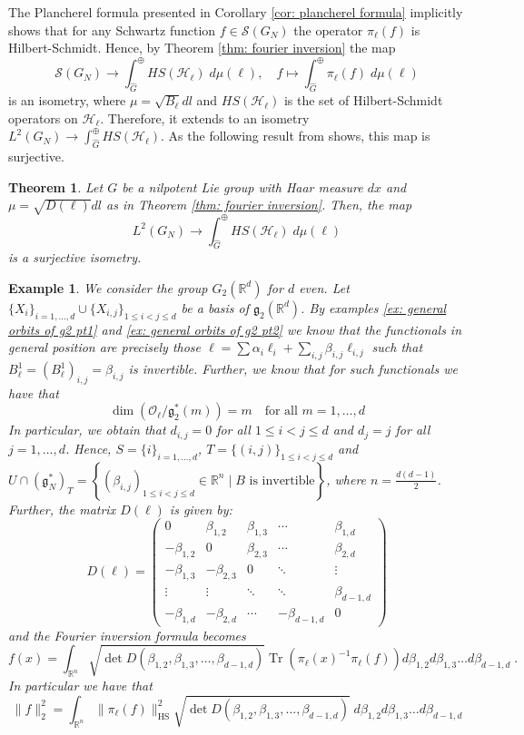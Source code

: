 \documentclass[pdflatex,sn-mathphys-num]{sn-jnl}
\theoremstyle{thmstyletwo}
\theoremstyle{thmstyleone}
\newtheorem{theorem}[definition]{Theorem}
\theoremstyle{thmstyletwo}
\newtheorem{example}[definition]{Example}
\newcommand{\fancyg}{\mathfrak{g}}
\begin{document}
		The Plancherel formula presented in Corollary \ref{cor: plancherel formula} implicitly shows that for any Schwartz function $f \in \mathcal{S}(G_N)$ the operator $\pi_{\ell}(f)$ is Hilbert-Schmidt. Hence, by Theorem \ref{thm: fourier inversion} the map
		\[
		\mathcal{S}(G_N)\to \int_{\hat{G}}^{\oplus}HS(\mathcal{H}_{\ell})\; d\mu(\ell), \quad
		f \mapsto \int_{\hat{G}}^{\oplus}\pi_{\ell}(f)\; d\mu(\ell)
		\]
		is an isometry, where $\mu = \sqrt{B_{\ell}}dl$ and $HS(\mathcal{H}_{\ell})$ is the set of Hilbert-Schmidt operators on $\mathcal{H}_{\ell}$. Therefore, it extends to an isometry $L^2(G_N) \to \int_{\hat{G}}^{\oplus}HS(\mathcal{H}_{\ell})$. As the following result from \cite{corwin1990representations} shows, this map is surjective.
		\begin{theorem}
			Let $G$ be a nilpotent Lie group with Haar measure $dx$ and $\mu = \sqrt{D(\ell)}dl$ as in Theorem \ref{thm: fourier inversion}. Then, the map
			\[
			L^2(G_N)\to \int_{\hat{G}}^{\oplus}HS(\mathcal{H}_{\ell})\; d\mu(\ell)
			\]
			is a surjective isometry. 
		\end{theorem}
		\begin{example}\label{ex:explicit formula for g2}
			We consider the group $G_2(\mathbb{R}^d)$ for $d$ even. Let $\{X_{i}\}_{i=1,\ldots,d} \cup \{X_{i,j}\}_{1\leq i<j\leq d}$ be a basis of $\fancyg_2(\mathbb{R}^d)$. By examples \ref{ex: general orbits of g2 pt1} and \ref{ex: general orbits of g2 pt2} we know that the functionals in general position are precisely those $\ell = \sum \alpha_i \ell_i + \sum_{i,j} \beta_{i,j} \ell_{i,j}$ such that $B_{\ell}^1 = (B_{\ell}^1)_{i,j} = \beta_{i,j}$ is invertible. Further, we know that for such functionals we have that
			\[\dim\left(\mathcal{O}_{\ell}/\fancyg_{2}^*(m)\right) = m \quad
			\text{for all } m = 1, \ldots, d\]
			In particular, we obtain that $d_{i,j} = 0$ for all $1\leq i<j \leq d$ and $d_{j} = j$ for all $j = 1, \ldots, d$. Hence, $S=\{i\}_{i=1,\ldots,d}$, $T = \{(i,j)\}_{1\leq i<j\leq d}$ and $U \cap (\fancyg_{N}^*)_T =\left\{ (\beta_{i,j})_{1\leq i<j\leq d} \in \mathbb{R}^n \; | \; B \text{ is invertible} \right\}$, where $n = \frac{d(d-1)}{2}$. Further, the matrix $D(\ell)$ is given by:
			\[
			D(\ell) = \begin{pmatrix} 0 & \beta_{1,2} & \beta_{1,3} & \cdots & 	\beta_{1,d} \\ -\beta_{1,2} & 0 & \beta_{2,3} & \cdots & \beta_{2,d} \\ -\beta_{1,3} & -\beta_{2,3} & 0 &\ddots & \vdots \\ \vdots & \vdots & \ddots & \ddots & \beta_{d-1,d} \\ -\beta_{1,d} & -\beta_{2,d} & \cdots & -\beta_{d-1,d} & 0 \end{pmatrix}
			\]
			and the Fourier inversion formula becomes
			\[
			f(x) = \int_{\mathbb{R}^n}\sqrt{\operatorname{det}D(\beta_{1,2},\beta_{1,3},\ldots, \beta_{d-1,d})}\operatorname{Tr}\left( \pi_{\ell}(x)^{-1}\pi_{\ell}(f)\right)d\beta_{1,2}d\beta_{1,3}\ldots d\beta_{d-1,d} \;.
			\]
			In particular we have that
			\[
			\|f\|_2^2 = \int_{\mathbb{R}^n}\|\pi_{\ell}(f)\|_{\text{HS}}^2\sqrt{\operatorname{det}D(\beta_{1,2},\beta_{1,3},\ldots ,\beta_{d-1,d})}\;d\beta_{1,2}d\beta_{1,3}\ldots d\beta_{d-1,d}
			\]		
		\end{example}
\end{document}
